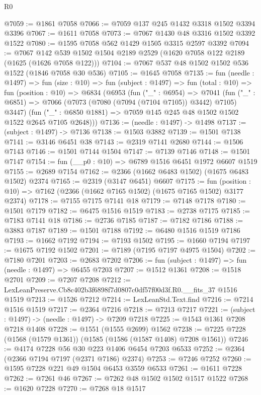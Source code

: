 \begin{lexlean}{R0}
\begin{coremodule}
@7059 := @1861 @7058
@7066 := @7059 @137 @245 @1432 @3318 @1502 @3394 @3396
@7067 := @1611 @7058
@7073 := @7067 @1430 @48 @3316 @1502 @3392 @1522
@7080 := @1595 @7058 @562 @1429 @1505 @3315 @2597 @3392
@7094 := @7067 @142 @539 @1502 @1504 @2189 @2529 (@1620 @7058 @122 @2189 (@1625 (@1626 @7058 @122)))
@7104 := @7067 @537 @48 @1502 @1502 @536 @1522 (@1846 @7058 @30 @536)
@7105 := @1645 @7058
@7135 := fun (needle : @1497) =>
  fun (size : @10) =>
  fun (subject : @1497) =>
  fun (total : @10) =>
  fun (position : @10) =>
  @6834
    (@6953
      (fun ("_" : @6954) =>
      @7041
        (fun ("_" : @6851) => @7066 (@7073 (@7080 (@7094 (@7104 @7105)) @3442) @7105) @3447)
        (fun ("_" : @6850 @1881) => @7059 @145 @245 @48 @1502 @1502 @1522 @2645 @7105 @2648)))
@7136 := (needle : @1497) -> @1498
@7137 := (subject : @1497) -> @7136
@7138 := @1503 @3882
@7139 := @1501 @7138
@7141 := @3146 @6451 @38
@7143 := @2319 @7141 @2680
@7144 := @1506 @7143
@7146 := @1501 @7144 @1504
@7147 := @7139 @7146
@7148 := @1501 @7147
@7154 := fun (__p0 : @10) => @6789 @1516 @6451 @1972 @6607 @1519
@7155 := @2689 @7154
@7162 := @2366 (@1662 @6483 @1502) (@1675 @6483 @1502) @2374
@7165 := @2319 (@3147 @6451) @6607
@7175 := fun (position : @10) => @7162 (@2366 (@1662 @7165 @1502) (@1675 @7165 @1502) @3177 @2374)
@7178 := @7155 @7175 @7141 @18
@7179 := @7148 @7178
@7180 := @1501 @7179
@7182 := @6475 @1516 @1519
@7183 := @2738 @7175
@7185 := @7183 @7141 @18
@7186 := @2736 @7185
@7187 := @7182 @7186
@7188 := @3883 @7187
@7189 := @1501 @7188
@7192 := @6480 @1516 @1519 @7186
@7193 := @1662 @7192
@7194 := @7193 @1502
@7195 := @1660 @7194
@7197 := @1675 @7192 @1502
@7201 := @7189 (@7195 @7197 @4975 @1504)
@7202 := @7180 @7201
@7203 := @2683 @7202
@7206 := fun (subject : @1497) => fun (needle : @1497) => @6455 @7203
@7207 := @1512 @1361
@7208 := @1518 @2701
@7209 := @7207 @7208
@7212 := LexLeanPreserve.Cb8c402b3f6898f7d0807c0df57f00d3f.R0.__fits_37 @1516 @1519
@7213 := @1526 @7212
@7214 := LexLeanStd.Text.find
@7216 := @7214 @1516 @1519
@7217 := @2364 @7216
@7218 := @7213 @7217
@7221 := (subject : @1497) -> (needle : @1497) -> @7209 @7218
@7225 := @1543 @1361 @7208 @7218 @1408
@7228 := @1551 (@1555 @2699) @1562
@7238 := @7225 @7228 (@1568 (@1579 @1361)) (@1585 (@1586 (@1587 @1408) @7208 @1561))
@7246 := @4174 @7228 @56 @30 @223 @1406 @6454 @7203 @6533
@7252 := @2364 (@2366 @7194 @7197 (@2371 @7186) @2374)
@7253 := @7246 @7252
@7260 := @1595 @7228 @221 @49 @1504 @6453 @3559 @6533
@7261 := @1611 @7228
@7262 := @7261 @46
@7267 := @7262 @48 @1502 @1502 @1517 @1522
@7268 := @1620 @7228
@7270 := @7268 @18 @1517

\end{coremodule}
\end{lexlean}
